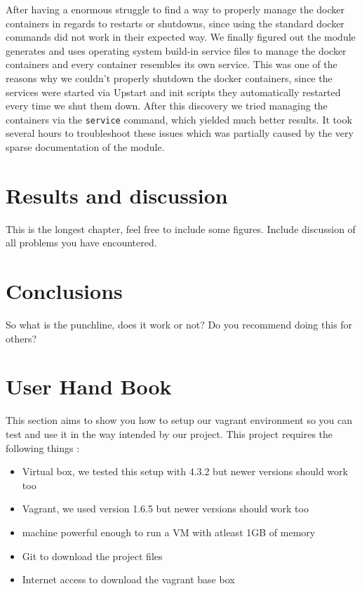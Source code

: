 After having a enormous struggle to find a way to properly manage the docker containers in regards to restarts or shutdowns, since using the standard docker commands did not work in their expected way. We finally figured out the module generates and uses operating system build-in service files to manage the docker containers and every container resembles its own service. This was one of the reasons why we couldn't properly shutdown the docker containers, since the services were started via Upstart and init scripts they automatically restarted every time we shut them down. After this discovery we tried managing the containers via the \verb|service| command, which yielded much better results. It took several hours to troubleshoot these issues which was partially caused by the very sparse documentation of the module.

\section{Results and discussion}

This is the longest chapter, feel free to include some figures. Include
discussion of all problems you have encountered.



\section{Conclusions}

So what is the punchline, does it work or not? Do you recommend doing this
for others?

\section{User Hand Book}
This section aims to show you how to setup our vagrant environment so you can test and use it in the way intended by our project.
This project requires the following things :
\begin{itemize}
\item Virtual box, we tested this setup with 4.3.2 but newer versions should work too
\item Vagrant, we used version 1.6.5 but newer versions should work too
\item machine powerful enough to run a \gls{VM} with atleast 1GB of memory
\item Git to download the project files
\item Internet access to download the vagrant base \gls{box}
\end{itemize}

